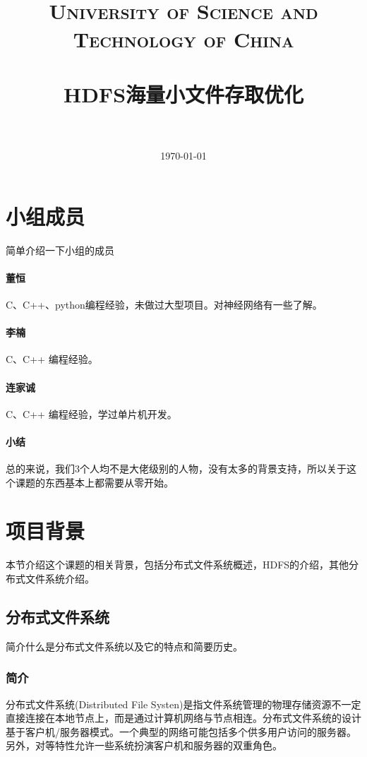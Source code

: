 \documentclass[UTF8]{ctexart}
\title{
  \normalfont \normalsize 
  \textsc{\\~\\~\\~\\~\\~\\University of Science and Technology of China} \\ [25pt] %
  \horrule{0.5pt} \\[0.4cm] %
  \huge HDFS海量小文件存取优化 \\ %
  \horrule{2pt} \\[0.5cm] %
}
\date{\today}
\begin{document}
\maketitle
\clearpage
\tableofcontents
\clearpage
\section{小组成员}
简单介绍一下小组的成员

\paragraph{董恒}
C、C++、python编程经验，未做过大型项目。对神经网络有一些了解。

\paragraph{李楠}
C、C++ 编程经验。

\paragraph{连家诚}
C、C++ 编程经验，学过单片机开发。

\paragraph{小结}
总的来说，我们3个人均不是大佬级别的人物，没有太多的背景支持，所以关于这个课题的东西基本上都需要从零开始。






\section{项目背景}
本节介绍这个课题的相关背景，包括分布式文件系统概述，HDFS的介绍，其他分布式文件系统介绍。

\subsection{分布式文件系统}
简介什么是分布式文件系统以及它的特点和简要历史。

\subsubsection{简介}
分布式文件系统(Distributed File Systen)是指文件系统管理的物理存储资源不一定直接连接在本地节点上，而是通过计算机网络与节点相连。分布式文件系统的设计基于客户机/服务器模式。一个典型的网络可能包括多个供多用户访问的服务器。另外，对等特性允许一些系统扮演客户机和服务器的双重角色。
\end{document}
